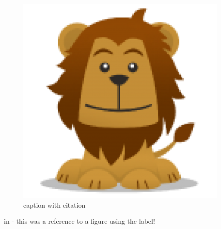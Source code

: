 \begin{figure}[!hbp]
\includegraphics[scale = 0.5]{img/test3.png}
\caption{ caption \protect with citation \cite{smeets_throwing_2002}}
\label{fig:test1}
\end{figure}

in  - this was a reference to a figure using the label!








%